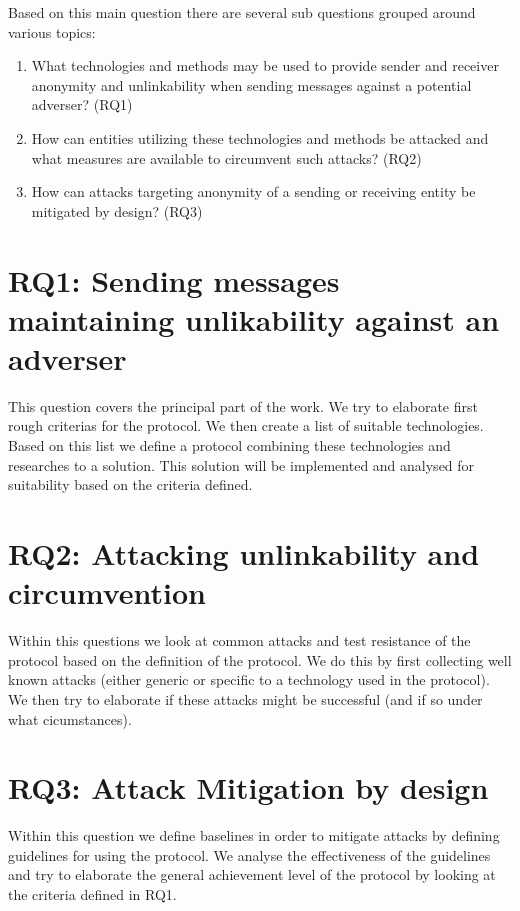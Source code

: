 Based on this main question there are several sub questions grouped around various topics:

\begin{enumerate}
	\item What technologies and methods may be used to provide sender and receiver anonymity and unlinkability when sending messages against a potential adverser? (RQ1)
	\item How can entities utilizing these technologies and methods be attacked and what measures are  available to circumvent such attacks? (RQ2)
	\item How can attacks targeting anonymity of a sending or receiving entity be mitigated by design? (RQ3)
\end{enumerate}

\section{RQ1: Sending messages maintaining unlikability against an adverser}
This question covers the principal part of the work. We try to elaborate first rough criterias for the protocol. We then create a list of suitable technologies. Based on this list we define a protocol combining these technologies and researches to a solution. This solution will be implemented and analysed for suitability based on the criteria defined.

\section{RQ2: Attacking unlinkability and circumvention}
Within this questions we look at common attacks and test resistance of the protocol based on the definition of the protocol. We do this by first collecting well known attacks (either generic or specific to a technology used in the protocol). We then try to elaborate if these attacks might be successful (and if so under what cicumstances).

\section{RQ3: Attack Mitigation by design}
Within this question we define baselines in order to mitigate attacks by defining guidelines for using the protocol. We analyse the effectiveness of the guidelines and try to elaborate the general achievement level of the protocol by looking at the criteria defined in RQ1.

